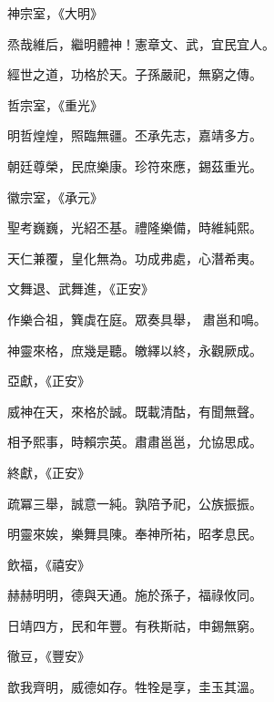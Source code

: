 \begin{pinyinscope}
 神宗室，《大明》



 烝哉維后，繼明體神！憲章文、武，宜民宜人。



 經世之道，功格於天。子孫嚴祀，無窮之傳。



 哲宗室，《重光》



 明哲煌煌，照臨無疆。丕承先志，嘉靖多方。



 朝廷尊榮，民庶樂康。珍符來應，錫茲重光。



 徽宗室，《承元》



 聖考巍巍，光紹丕基。禮隆樂備，時維純熙。



 天仁兼覆，皇化無為。功成弗處，心潛希夷。



 文舞退、武舞進，《正安》



 作樂合祖，簨虡在庭。眾奏具舉，
 肅邕和鳴。



 神靈來格，庶幾是聽。皦繹以終，永觀厥成。



 亞獻，《正安》



 威神在天，來格於誠。既載清酤，有聞無聲。



 相予熙事，時賴宗英。肅肅邕邕，允協思成。



 終獻，《正安》



 疏冪三舉，誠意一純。孰陪予祀，公族振振。



 明靈來娭，樂舞具陳。奉神所祐，昭孝息民。



 飲福，《禧安》



 赫赫明明，德與天通。施於孫子，福祿攸同。



 日靖四方，民和年豐。有秩斯祜，申錫無窮。



 徹豆，《豐安》



 歆我齊明，威德如存。牲牷是享，圭玉其溫。




\end{pinyinscope}
